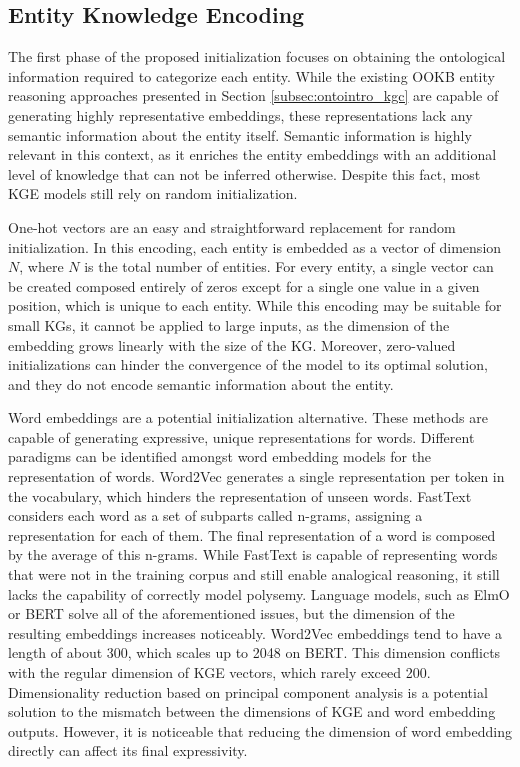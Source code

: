 \subsection{Entity Knowledge Encoding}\label{subsec:s4_entity_encode}
The first phase of the proposed initialization focuses on obtaining the ontological information required to categorize each entity. While the existing OOKB entity reasoning approaches presented in Section \ref{subsec:ontointro_kgc} are capable of generating highly representative embeddings, these representations lack any semantic information about the entity itself. Semantic information is highly relevant in this context, as it enriches the entity embeddings with an additional level of knowledge that can not be inferred otherwise. Despite this fact, most KGE models still rely on random initialization. 

One-hot vectors are an easy and straightforward replacement for random initialization. In this encoding, each entity is embedded as a vector of dimension $N$, where $N$ is the total number of entities. For every entity, a single vector can be created composed entirely of zeros except for a single one value in a given position, which is unique to each entity. While this encoding may be suitable for small KGs, it cannot be applied to large inputs, as the dimension of the embedding grows linearly with the size of the KG. Moreover, zero-valued initializations can hinder the convergence of the model to its optimal solution, and they do not encode semantic information about the entity.

Word embeddings are a potential initialization alternative. These methods are capable of generating expressive, unique representations for words. Different paradigms can be identified amongst word embedding models for the representation of words. Word2Vec \citep{word2vec} generates a single representation per token in the vocabulary, which hinders the representation of unseen words. FastText \citep{fasttext1,fasttext2} considers each word as a set of subparts called n-grams, assigning a representation for each of them. The final representation of a word is composed by the average of this n-grams. While FastText is capable of representing words that were not in the training corpus and still enable analogical reasoning, it still lacks the capability of correctly model polysemy. Language models, such as ElmO \citep{elmo} or BERT \citep{bert} solve all of the aforementioned issues, but the dimension of the resulting embeddings increases noticeably. Word2Vec embeddings tend to have a length of about 300, which scales up to 2048 on BERT. This dimension conflicts with the regular dimension of KGE vectors, which rarely exceed 200. Dimensionality reduction based on principal component analysis is a potential solution to the mismatch between the dimensions of KGE and word embedding outputs. However, it is noticeable that reducing the dimension of word embedding directly can affect its final expressivity. 

